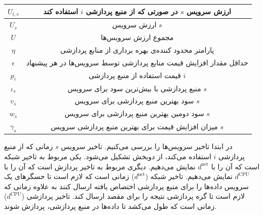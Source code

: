 \begin{table}[h]
\begin{tabularx}{\textwidth}{|c|C|}
        $U_{i,s}$           & ارزش سرویس $s$ در صورتی که از منبع پردازشی $i$ استفاده کند                                 \\ \hline
        $U_s$               & ارزش سرویس $s$                                                                             \\ \hline
        $U$                 & مجموع ارزش سرویس‌ها                                                                         \\ \hline
        $\eta$              & پارامتر محدود کننده‌ی بهره برداری از منابع پردازشی                                          \\ \hline
        $\epsilon$          & حداقل مقدار افزایش قیمت منابع پردازشی توسط سرویس‌ها در هر پیشنهاد                           \\ \hline
        $p_i$               & قیمت استفاده از منبع پردازشی $i$                                                           \\ \hline
        $\iota_s$           & منبع پردازشی با بیش‌ترین سود برای سرویس $s$                                                 \\ \hline
        $v_s$               & سود بهترین منبع پردازشی برای سرویس $s$                                                     \\ \hline
        $w_s$               & سود دومین بهترین منبع پردازشی برای سرویس $s$                                               \\ \hline
        $\gamma_s$          & میزان افزایش قیمت برای بهترین منبع پردازشی سرویس $s$                                       \\ \hline
      \end{tabularx}
      \label{tbl:one_to_one:notation}
    \end{table}

    در ابتدا تاخیر سرویس‌ها را بررسی می‌کنیم.
    تاخیر سرویس $s$ زمانی که از منبع پردازشی $i$ استفاده می‌کند، از دوبخش تشکیل می‌شود.
    یکی مربوط به تاخیر شبکه‌ است که آن را با $d^\text{net}$ نمایش می‌دهیم.
    دیگری مربوط به تاخیر پردازش است که آن را با $d^\text{CPU}$ نمایش می‌دهیم.
    تاخیر شبکه ($d^\text{net}$) زمانی است که لازم است تا حسگر‌‌های یک سرویس داده‌ها را برای منبع پردازشی اختصاص یافته ارسال کنند به علاوه زمانی که لازم است تا گره پردازشی نتیجه را برای مقصد ارسال کند.
    تاخیر پردازشی ($d^\text{CPU}$) زمانی است که طول می‌کشد تا داده‌ها در منبع پردازشی، پردازش شوند.
    
